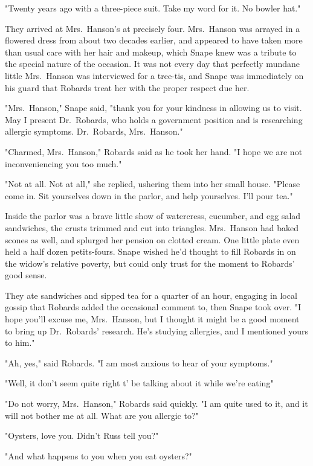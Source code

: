 "Twenty years ago with a three-piece suit. Take my word for it. No bowler hat."

They arrived at Mrs.~Hanson's at precisely four. Mrs.~Hanson was arrayed in a flowered dress from about two decades earlier, and appeared to have taken more than usual care with her hair and makeup, which Snape knew was a tribute to the special nature of the occasion. It was not every day that perfectly mundane little Mrs.~Hanson was interviewed for a tree-tis, and Snape was immediately on his guard that Robards treat her with the proper respect due her.

"Mrs.~Hanson," Snape said, "thank you for your kindness in allowing us to visit. May I present Dr.~Robards, who holds a government position and is researching allergic symptoms. Dr.~Robards, Mrs.~Hanson."

"Charmed, Mrs.~Hanson," Robards said as he took her hand. "I hope we are not inconveniencing you too much."

"Not at all. Not at all," she replied, ushering them into her small house. "Please come in. Sit yourselves down in the parlor, and help yourselves. I'll pour tea."

Inside the parlor was a brave little show of watercress, cucumber, and egg salad sandwiches, the crusts trimmed and cut into triangles. Mrs.~Hanson had baked scones as well, and splurged her pension on clotted cream. One little plate even held a half dozen petits-fours. Snape wished he'd thought to fill Robards in on the widow's relative poverty, but could only trust for the moment to Robards' good sense.

They ate sandwiches and sipped tea for a quarter of an hour, engaging in local gossip that Robards added the occasional comment to, then Snape took over. "I hope you'll excuse me, Mrs.~Hanson, but I thought it might be a good moment to bring up Dr.~Robards' research. He's studying allergies, and I mentioned yours to him."

"Ah, yes," said Robards. "I am most anxious to hear of your symptoms."

"Well, it don't seem quite right t' be talking about it while we're eating{\el}"

"Do not worry, Mrs.~Hanson," Robards said quickly. "I am quite used to it, and it will not bother me at all. What are you allergic to?"

"Oysters, love you. Didn't Russ tell you?"

"And what happens to you when you eat oysters?"

